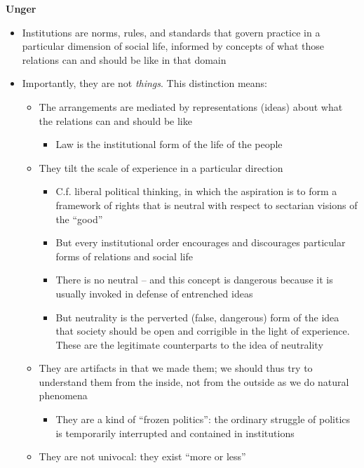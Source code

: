 \textbf{Unger}

\begin{itemize}
\tightlist
\item
  Institutions are norms, rules, and standards that govern practice in a
  particular dimension of social life, informed by concepts of what
  those relations can and should be like in that domain
\item
  Importantly, they are not \emph{things}. This distinction means:

  \begin{itemize}
  \tightlist
  \item
    The arrangements are mediated by representations (ideas) about what
    the relations can and should be like

    \begin{itemize}
    \tightlist
    \item
      Law is the institutional form of the life of the people
    \end{itemize}
  \item
    They tilt the scale of experience in a particular direction

    \begin{itemize}
    \tightlist
    \item
      C.f. liberal political thinking, in which the aspiration is to
      form a framework of rights that is neutral with respect to
      sectarian visions of the ``good''
    \item
      But every institutional order encourages and discourages
      particular forms of relations and social life
    \item
      There is no neutral -- and this concept is dangerous because it is
      usually invoked in defense of entrenched ideas
    \item
      But neutrality is the perverted (false, dangerous) form of the
      idea that society should be open and corrigible in the light of
      experience. These are the legitimate counterparts to the idea of
      neutrality
    \end{itemize}
  \item
    They are artifacts in that we made them; we should thus try to
    understand them from the inside, not from the outside as we do
    natural phenomena

    \begin{itemize}
    \tightlist
    \item
      They are a kind of ``frozen politics'': the ordinary struggle of
      politics is temporarily interrupted and contained in institutions
    \end{itemize}
  \item
    They are not univocal: they exist ``more or less''


\end{itemize}
\end{itemize}
